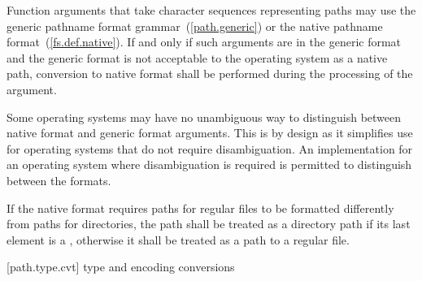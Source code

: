 \pnum
Function arguments that take character sequences representing
paths may use the generic pathname format grammar~(\ref{path.generic}) or
the native pathname format~(\ref{fs.def.native}). If and only if such
arguments are in the generic format and the generic format is not acceptable to
the operating system as a native path, conversion to native format shall be
performed during the processing of the argument.

\pnum
\begin{note}
Some operating systems may have no unambiguous way to distinguish between native format and generic format arguments.
This is by design as it simplifies use for operating systems that do not require
disambiguation. An implementation for an operating system where disambiguation
is required is permitted to distinguish between the formats.
\end{note}

\pnum
If the native format requires paths for regular files to be formatted
differently from paths for directories, the path shall be treated as a directory
path if its last element is a ,
otherwise it shall be treated as a path to a regular file.

[path.type.cvt]{ type and encoding conversions}


